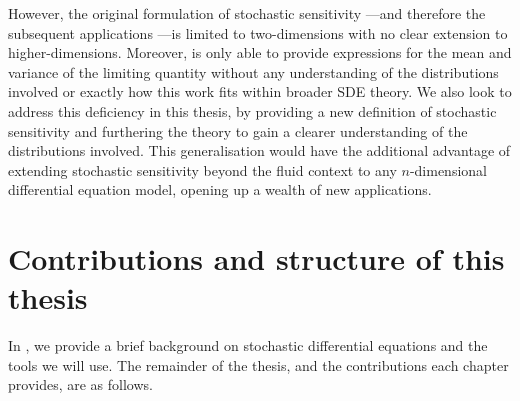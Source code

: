 However, the original formulation of stochastic sensitivity \citep{Balasuriya_2020_StochasticSensitivityComputable}---and therefore the subsequent applications \citep{Balasuriya_2020_UncertaintyFinitetimeLyapunov,BadzaEtAl_2023_HowSensitiveAre,FangOuellette_2021_AssessingInformationContent,FangEtAl_2020_DisentanglingResolutionPrecision}---is limited to two-dimensions with no clear extension to higher-dimensions.
Moreover, \citet{Balasuriya_2020_StochasticSensitivityComputable} is only able to provide expressions for the mean and variance of the limiting quantity without any understanding of the distributions involved or exactly how this work fits within broader SDE theory.
We also look to address this deficiency in this thesis, by providing a new definition of stochastic sensitivity and furthering the theory to gain a clearer understanding of the distributions involved.
This generalisation would have the additional advantage of extending stochastic sensitivity beyond the fluid context to any \(n\)-dimensional differential equation model, opening up a wealth of new applications.


\section{Contributions and structure of this thesis}\label{sec:intro_structure}
In , we provide a brief background on stochastic differential equations and the tools we will use.
The remainder of the thesis, and the contributions each chapter provides, are as follows.


